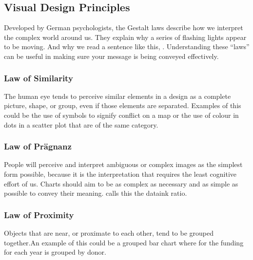 \documentclass[letterpaper,10pt,english]{jupyterBook}
\begin{document}
\subsection{Visual Design Principles}
\label{\detokenize{part1/communication:visual-design-principles}}
\sphinxAtStartPar
Developed by German psychologists, the Gestalt laws describe how we interpret the complex world around us. They explain why a series of flashing lights appear to be moving. And why we read a sentence like this, . Understanding these “laws” can be useful in making sure your message is being conveyed effectively.


\subsubsection{Law of Similarity}
\label{\detokenize{part1/communication:law-of-similarity}}
\sphinxAtStartPar
{}The human eye tends to perceive similar elements in a design as a complete picture, shape, or group, even if those elements are separated.
Examples of this could be the use of symbols to signify conflict on a map or the use of colour in dots in a scatter plot that are of the same category.


\subsubsection{Law of Prägnanz}
\label{\detokenize{part1/communication:law-of-pragnanz}}
\sphinxAtStartPar
{}People will perceive and interpret ambiguous or complex images as the simplest form possible, because it is the interpretation that requires the least cognitive effort of us. Charts should aim to be as complex as necessary and as simple as possible to convey their meaning.  calls this the data\sphinxhyphen{}ink ratio.


\subsubsection{Law of Proximity}
\label{\detokenize{part1/communication:law-of-proximity}}
\sphinxAtStartPar
{}Objects that are near, or proximate to each other, tend to be grouped together.An example of this could be a grouped bar chart where for the funding for each year is grouped by donor.
\end{document}
